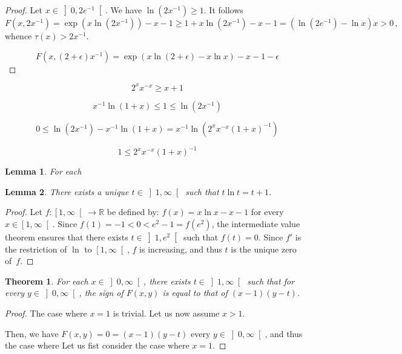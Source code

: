 \documentclass[12pt]{article}
\newcommand{\bR}{\mathbb{R}}
\newcommand{\gtint}[1]{\left] #1, \infty \right[}
\newcommand{\geint}[1]{\left[ #1, \infty \right[}
\newtheorem{theorem}{Theorem}
\newtheorem{lemma}{Lemma}
\begin{document}
\begin{proof}
  Let $x \in \left]0, 2 e^{-1} \right[$.
  We have 
  $\ln(2 x^{-1}) \ge 1$.
  It follows
  $$
  F(x, 2x^{-1})
  = \exp (x \ln(2 x^{-1})) - x - 1 
  \ge 1 + x \ln(2 x^{-1}) - x - 1
  = \left(\ln(2 e^{-1}) - \ln  x \right) x > 0\,, 
  $$
  whence $\tau(x) > 2 x^{-1}$.

  $$
  F(x, (2 + \epsilon) x^{-1}) = \exp(x \ln(2 + \epsilon) - x \ln x) - x - 1 - \epsilon
  $$
\end{proof}
$$
2^xx^{-x} \ge  x + 1
$$

$$
x^{-1}  \ln(1 + x) \le 1 \le \ln (2x^{-1}) 
$$

$$
0 \le \ln(2 x^{-1} ) - x^{-1} \ln( 1 + x) = x^{-1} \ln \left( 2^x x^{-x} {(1 + x)}^{-1} \right)
$$

$$
1 \le 2^x x^{- x} {(1 + x)}^{-1} 
$$
\begin{lemma}
  For each 
\end{lemma}
\begin{lemma}
  There exists a unique $t \in \gtint{1}$ such that $t \ln t = t + 1$.
\end{lemma}

\begin{proof}
  Let $f\colon \geint{1} \to \bR$ be defined by:
  $f(x) = x \ln x - x - 1$ for every $x \in \geint{1}$.
  Since $f(1) = - 1 < 0 < e^2 - 1 = f(e^2)$, 
  the intermediate value theorem ensures that there exists $t \in \left]1, e^2 \right[$ such that
  $f(t) = 0$.
  Since $f'$ is the restriction of $\ln$ to $\geint{1}$,
  $f$ is increasing, and thus $t$ is the unique zero of~$f$.
\end{proof}

\begin{theorem}
  For each $x \in \gtint{0}$,
  there exists $t \in \gtint{1}$ such that for every $y \in \gtint{0}$,
  the sign of $F(x, y)$ is equal to that of $(x - 1) (y - t)$.
\end{theorem}

\begin{proof}
  The case where $x = 1$ is trivial.
  Let us now assume $x > 1$.
 
  Then, we have $F(x, y) = 0 = (x - 1) (y - t)$   every $y \in \gtint{0}$,
  and thus 
  the case where 
  Let us fist consider the case where $x = 1$.
  
\end{proof} 
\end{document}
